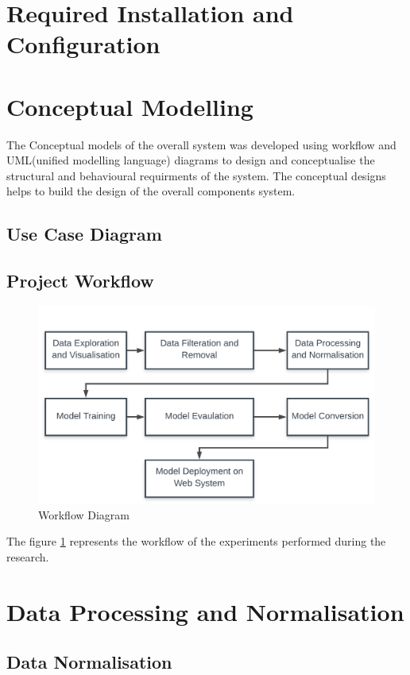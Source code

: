 \section{Required Installation and Configuration}

\pagebreak
\section{Conceptual Modelling}
The Conceptual models of the overall system was developed using workflow 
and UML(unified modelling language) diagrams to design and conceptualise
the structural and behavioural requirments of the system. The conceptual designs 
helps to build the design of the overall components system.
\subsection{Use Case Diagram}

\subsection{Project Workflow}
\begin{figure}[!htp]
    \centering
    \includegraphics[width=\textwidth]{Images/worflow.png}
    \caption{Workflow Diagram}
    \label{figure:workflow}
\end{figure}

The figure \ref{figure:workflow} represents the workflow of the experiments 
performed during the research.
\pagebreak
\section{Data Processing and Normalisation}

\subsection{Data Normalisation}

